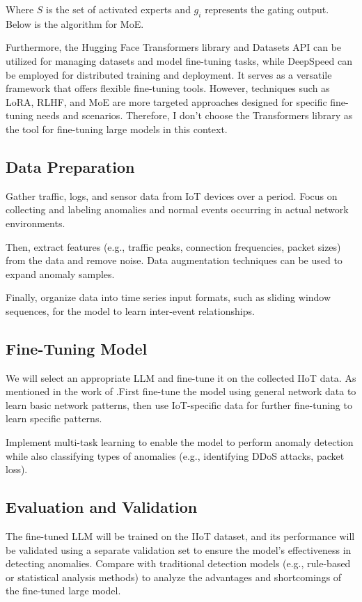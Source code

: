 \documentclass[usenatbib]{tjaa}
\begin{document}
Where $S$ is the set of activated experts and $g_i$ represents the gating output.
Below is the algorithm for MoE.

Furthermore, the Hugging Face Transformers library and Datasets API can be utilized for
managing datasets and model fine-tuning tasks,
while DeepSpeed can be employed for distributed training and deployment.
It serves as a versatile framework that offers flexible fine-tuning tools.
However, techniques such as LoRA, RLHF, and MoE are more targeted approaches
designed for specific fine-tuning needs and scenarios.
Therefore, I don't choose the Transformers library as the tool for fine-tuning
large models in this context.

\subsection{Data Preparation}

Gather traffic, logs, and sensor data from IoT devices over a period.
Focus on collecting and labeling anomalies and normal events occurring
in actual network environments.

Then, extract features (e.g., traffic peaks, connection frequencies, packet sizes)
from the data and remove noise. Data augmentation techniques can be
used to expand anomaly samples.

Finally, organize data into time series input formats,
such as sliding window sequences, for the model to learn
inter-event relationships.

\subsection{Fine-Tuning Model}

We will select an appropriate LLM and fine-tune it on the collected IIoT data. As mentioned in the work of
\citet{sarabi2023llm}.First fine-tune the model using general network data to learn basic network patterns,
then use IoT-specific data for further fine-tuning to learn specific patterns.

Implement multi-task learning to enable the model to perform anomaly detection while also
classifying types of anomalies (e.g., identifying DDoS attacks, packet loss).

\subsection{Evaluation and Validation}

The fine-tuned LLM will be trained on the IIoT dataset, and its performance will be
validated using a separate validation set to ensure the model's effectiveness in detecting anomalies.
Compare with traditional detection models (e.g., rule-based or statistical analysis methods) to analyze
the advantages and shortcomings of the fine-tuned large model.
\end{document}
